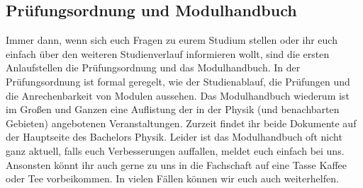\subsection{Prüfungsordnung und Modulhandbuch}

\begin{figure}[b]
\end{figure}

Immer dann, wenn sich euch Fragen zu eurem Studium stellen oder ihr euch einfach über den weiteren Studienverlauf informieren wollt, sind die ersten Anlaufstellen die Prüfungsordnung und das Modulhandbuch. In der Prüfungsordnung ist formal geregelt, wie der Studienablauf, die Prüfungen und die Anrechenbarkeit von Modulen aussehen. Das Modulhandbuch wiederum ist im Großen und Ganzen eine Auflistung der in der Physik (und benachbarten Gebieten) angebotenen Veranstaltungen. Zurzeit findet ihr beide Dokumente auf der Hauptseite des Bachelors Physik. Leider ist das Modulhandbuch oft nicht ganz aktuell, falls euch Verbesserungen auffallen, meldet euch einfach bei uns.\\

Ansonsten könnt ihr auch gerne zu uns in die Fachschaft auf eine Tasse Kaffee oder Tee vorbeikommen. In vielen Fällen können wir euch auch weiterhelfen.

